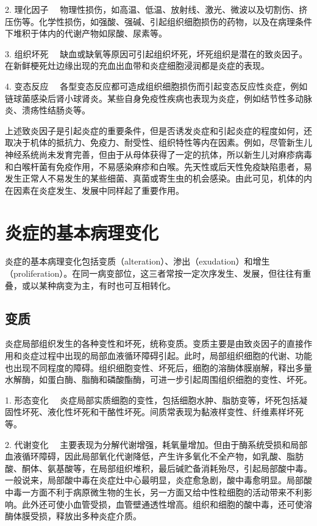 {2. 理化因子}
　物理性损伤，如高温、低温、放射线、激光、微波以及切割伤、挤压伤等。化学性损伤，如强酸、强碱、引起组织细胞损伤的药物，以及在病理条件下堆积于体内的代谢产物如尿酸、尿素等。

{3. 组织坏死}
　缺血或缺氧等原因可引起组织坏死，坏死组织是潜在的致炎因子。在新鲜梗死灶边缘出现的充血出血带和炎症细胞浸润都是炎症的表现。

{4. 变态反应}
　各型变态反应都可造成组织细胞损伤而引起变态反应性炎症，例如链球菌感染后肾小球肾炎。某些自身免疫性疾病也表现为炎症，例如结节性多动脉炎、溃疡性结肠炎等。

上述致炎因子是引起炎症的重要条件，但是否诱发炎症和引起炎症的程度如何，还取决于机体的抵抗力、免疫力、耐受性、组织特性等内在因素。例如，尽管新生儿神经系统尚未发育完善，但由于从母体获得了一定的抗体，所以新生儿对麻疹病毒和白喉杆菌有免疫作用，不易感染麻疹和白喉。先天性或后天性免疫缺陷患者，易发生正常人不易发生的某些细菌、真菌或寄生虫的机会感染。由此可见，机体的内在因素在炎症发生、发展中同样起了重要作用。

\section{炎症的基本病理变化}

炎症的基本病理变化包括变质（alteration）、渗出（exudation）和增生（proliferation）。在同一病变部位，这三者常按一定次序发生、发展，但往往有重叠，或以某种病变为主，有时也可互相转化。

\subsection{变质}

炎症局部组织发生的各种变性和坏死，统称变质。变质主要是由致炎因子的直接作用和炎症过程中出现的局部血液循环障碍引起。此时，局部组织细胞的代谢、功能也出现不同程度的障碍。组织细胞变性、坏死后，细胞的溶酶体膜崩解，释出多量水解酶，如蛋白酶、脂酶和磷酸酯酶，可进一步引起周围组织细胞的变性、坏死。

{1. 形态变化}
　炎症局部实质细胞的变性，包括细胞水肿、脂肪变等，坏死包括凝固性坏死、液化性坏死和干酪性坏死。间质常表现为黏液样变性、纤维素样坏死等。

{2. 代谢变化}
　主要表现为分解代谢增强，耗氧量增加。但由于酶系统受损和局部血液循环障碍，因此局部氧化代谢降低，产生许多氧化不全产物，如乳酸、脂肪酸、酮体、氨基酸等，在局部组织堆积，最后碱贮备消耗殆尽，引起局部酸中毒。一般说来，局部酸中毒在炎症灶中心最明显，炎症愈急剧，酸中毒愈明显。局部酸中毒一方面不利于病原微生物的生长，另一方面又给中性粒细胞的活动带来不利影响。此外还可使小血管受损，血管壁通透性增高。组织和细胞的酸中毒，还可使溶酶体膜受损，释放出多种炎症介质。

